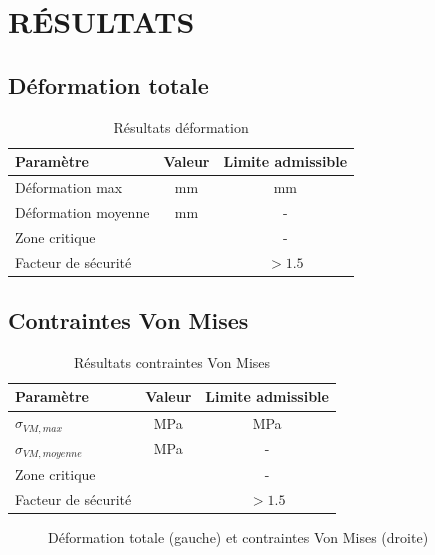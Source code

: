 \documentclass[12pt,a4paper]{article}
\begin{document}
			
\newpage






			\section{RÉSULTATS}
			
					\subsection{Déformation totale}
					\begin{table}[H]
						\centering
						\begin{tabular}{lcc}
							\toprule
							\textbf{Paramètre} & \textbf{Valeur} & \textbf{Limite admissible} \\
							\midrule
							Déformation max & \dotfill mm & \dotfill mm \\
							Déformation moyenne & \dotfill mm & - \\
							Zone critique & \dotfill & - \\
							Facteur de sécurité & \dotfill & $>1.5$ \\
							\bottomrule
						\end{tabular}
						\caption{Résultats déformation}
					\end{table}
					
					\subsection{Contraintes Von Mises}
					\begin{table}[H]
						\centering
						\begin{tabular}{lcc}
							\toprule
							\textbf{Paramètre} & \textbf{Valeur} & \textbf{Limite admissible} \\
							\midrule
							$\sigma_{VM,max}$ & \dotfill MPa & \dotfill MPa \\
							$\sigma_{VM,moyenne}$ & \dotfill MPa & - \\
							Zone critique & \dotfill & - \\
							Facteur de sécurité & \dotfill & $>1.5$ \\
							\bottomrule
						\end{tabular}
						\caption{Résultats contraintes Von Mises}
					\end{table}
					
					\begin{figure}[H]
						\centering
						\caption{Déformation totale (gauche) et contraintes Von Mises (droite)}
					\end{figure}
			
\end{document}
